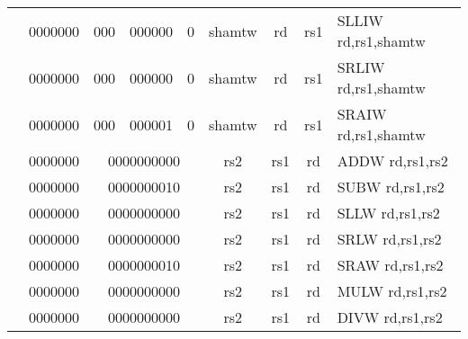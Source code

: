 \begin{table}[p]
\begin{small}
\begin{center}
\begin{tabular}{rcccccccccl}
&
\multicolumn{1}{|c|}{0000000} &
\multicolumn{2}{c|}{000} &
\multicolumn{2}{c|}{000000} &
\multicolumn{1}{c|}{0} &
\multicolumn{1}{c|}{shamtw} &
\multicolumn{1}{c|}{rd} &
\multicolumn{1}{c|}{rs1} & SLLIW rd,rs1,shamtw \\
\cline{2-10}
  

&
\multicolumn{1}{|c|}{0000000} &
\multicolumn{2}{c|}{000} &
\multicolumn{2}{c|}{000000} &
\multicolumn{1}{c|}{0} &
\multicolumn{1}{c|}{shamtw} &
\multicolumn{1}{c|}{rd} &
\multicolumn{1}{c|}{rs1} & SRLIW rd,rs1,shamtw \\
\cline{2-10}
  

&
\multicolumn{1}{|c|}{0000000} &
\multicolumn{2}{c|}{000} &
\multicolumn{2}{c|}{000001} &
\multicolumn{1}{c|}{0} &
\multicolumn{1}{c|}{shamtw} &
\multicolumn{1}{c|}{rd} &
\multicolumn{1}{c|}{rs1} & SRAIW rd,rs1,shamtw \\
\cline{2-10}
  

&
\multicolumn{1}{|c|}{0000000} &
\multicolumn{5}{c|}{0000000000} &
\multicolumn{1}{c|}{rs2} &
\multicolumn{1}{c|}{rs1} &
\multicolumn{1}{c|}{rd} & ADDW rd,rs1,rs2 \\
\cline{2-10}
  

&
\multicolumn{1}{|c|}{0000000} &
\multicolumn{5}{c|}{0000000010} &
\multicolumn{1}{c|}{rs2} &
\multicolumn{1}{c|}{rs1} &
\multicolumn{1}{c|}{rd} & SUBW rd,rs1,rs2 \\
\cline{2-10}
  

&
\multicolumn{1}{|c|}{0000000} &
\multicolumn{5}{c|}{0000000000} &
\multicolumn{1}{c|}{rs2} &
\multicolumn{1}{c|}{rs1} &
\multicolumn{1}{c|}{rd} & SLLW rd,rs1,rs2 \\
\cline{2-10}
  

&
\multicolumn{1}{|c|}{0000000} &
\multicolumn{5}{c|}{0000000000} &
\multicolumn{1}{c|}{rs2} &
\multicolumn{1}{c|}{rs1} &
\multicolumn{1}{c|}{rd} & SRLW rd,rs1,rs2 \\
\cline{2-10}
  

&
\multicolumn{1}{|c|}{0000000} &
\multicolumn{5}{c|}{0000000010} &
\multicolumn{1}{c|}{rs2} &
\multicolumn{1}{c|}{rs1} &
\multicolumn{1}{c|}{rd} & SRAW rd,rs1,rs2 \\
\cline{2-10}
  

&
\multicolumn{1}{|c|}{0000000} &
\multicolumn{5}{c|}{0000000000} &
\multicolumn{1}{c|}{rs2} &
\multicolumn{1}{c|}{rs1} &
\multicolumn{1}{c|}{rd} & MULW rd,rs1,rs2 \\
\cline{2-10}
  

&
\multicolumn{1}{|c|}{0000000} &
\multicolumn{5}{c|}{0000000000} &
\multicolumn{1}{c|}{rs2} &
\multicolumn{1}{c|}{rs1} &
\multicolumn{1}{c|}{rd} & DIVW rd,rs1,rs2 \\
\cline{2-10}
  


\end{tabular}
\end{center}
\end{small}
\end{table}
